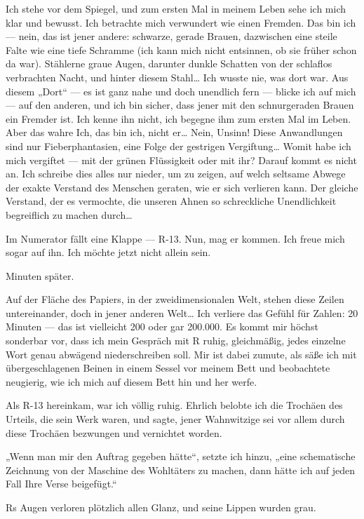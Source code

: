 Ich stehe vor dem Spiegel, und zum ersten Mal in meinem Leben sehe
ich mich klar und bewusst. Ich betrachte mich verwundert wie einen
Fremden. Das bin ich — nein, das ist jener andere: schwarze, gerade
Brauen, dazwischen eine steile Falte wie eine tiefe Schramme (ich
kann mich nicht entsinnen, ob sie früher schon da war). Stählerne
graue Augen, darunter dunkle Schatten von der schlaflos verbrachten
Nacht, und hinter diesem Stahl\ldots{} Ich wusste nie, was dort war. Aus
diesem „Dort“ — es ist ganz
nahe und doch unendlich fern — blicke ich auf mich — auf den
anderen, und ich bin sicher, dass jener mit den schnurgeraden
Brauen ein Fremder ist. Ich kenne ihn nicht, ich begegne ihm zum
ersten Mal im Leben. Aber das wahre Ich, das bin ich, nicht er\ldots{}
Nein, Unsinn! Diese Anwandlungen sind nur Fieberphantasien, eine
Folge der gestrigen Vergiftung\ldots{} Womit habe ich mich vergiftet —
mit der grünen Flüssigkeit oder mit ihr? Darauf kommt es nicht an.
Ich schreibe dies alles nur nieder, um zu zeigen, auf welch
seltsame Abwege der exakte Verstand des Menschen geraten, wie er
sich verlieren kann. Der gleiche Verstand, der es vermochte, die
unseren Ahnen so schreckliche Unendlichkeit begreiflich zu machen
durch\ldots{}

Im Numerator fällt eine Klappe — R-13. Nun, mag er kommen. Ich
freue mich sogar auf ihn. Ich möchte jetzt nicht allein sein.

 Minuten später.

Auf der Fläche des Papiers, in der zweidimensionalen Welt, stehen
diese Zeilen untereinander, doch in jener anderen Welt\ldots{} Ich
verliere das Gefühl für Zahlen: 20 Minuten — das ist vielleicht 200
oder gar 200.000. Es kommt mir höchst sonderbar vor, dass ich mein
Gespräch mit R ruhig, gleichmäßig, jedes einzelne Wort genau
abwägend niederschreiben soll. Mir ist dabei zumute, als säße ich
mit übergeschlagenen Beinen in einem Sessel vor meinem Bett und
beobachtete neugierig, wie ich mich auf diesem Bett hin und her
werfe.

Als R-13 hereinkam, war ich völlig ruhig. Ehrlich belobte ich die
Trochäen des Urteils, die sein Werk waren, und sagte, jener
Wahnwitzige sei vor allem durch diese Trochäen bezwungen und
vernichtet worden.

„Wenn man mir den Auftrag gegeben hätte“, setzte ich hinzu, „eine
schematische Zeichnung von der Maschine des Wohltäters zu machen,
dann hätte ich auf jeden Fall Ihre Verse beigefügt.“

Rs Augen verloren plötzlich allen Glanz, und seine Lippen wurden
grau.

